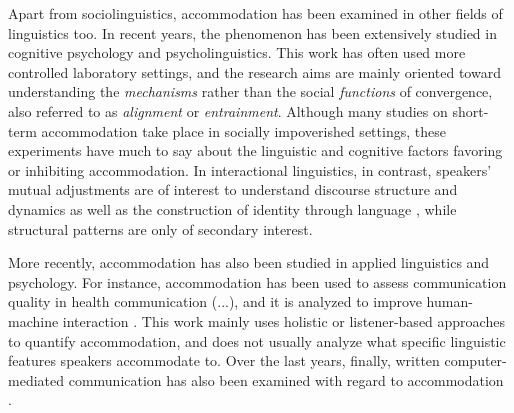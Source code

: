\documentclass[output=paper,
modfonts
]{langscibook}
\begin{document}
Apart from sociolinguistics, accommodation has been examined in other fields of linguistics too. In recent years, the phenomenon has been extensively studied in cognitive psychology and psycholinguistics. This work has often used more controlled laboratory settings, and the research aims are mainly oriented toward understanding the \textit{mechanisms} rather than the social \textit{functions} of convergence, also referred to as \textit{alignment} or \textit{entrainment}. %
Although many studies on short-term accommodation take place in socially impoverished settings, these experiments have much to say about the linguistic and cognitive factors favoring or inhibiting accommodation. %
% 
% 
% 
%
In interactional linguistics, in contrast, speakers' mutual adjustments are of interest to understand discourse structure and dynamics as well as the construction of identity through language \citep[e.g.][]{chakrani_arabic_2015,nilsson_dialect_2015}, while structural patterns are only of secondary interest.

More recently, accommodation has also been studied in applied linguistics and psychology. For instance, accommodation has been used to assess communication quality in health communication (...), %
% 
% 
and it is analyzed to improve human-machine interaction  \citep[e.g.][]{linnemann_as_2016}. This work mainly uses holistic or listener-based approaches to quantify accommodation, and does not usually analyze what specific linguistic features speakers accommodate to. Over the last years, finally, written computer-mediated communication has also been examined with regard to accommodation \citep[e.g.][]{Danescu-Niculescu-Mizil2011}.
% 
% 
\end{document}
